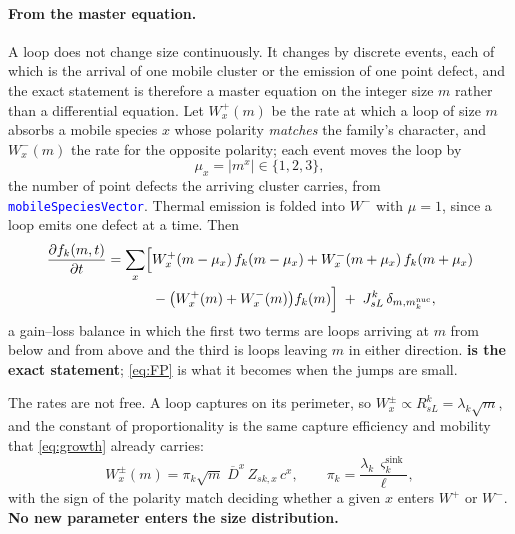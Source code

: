 \documentclass{article}
\newcommand{\textttclr}[1]{\textcolor{blue}{\texttt{#1}}}
\begin{document}
\paragraph{From the master equation.} A loop does not change size continuously.
It changes by discrete events, each of which is the arrival of one mobile cluster
or the emission of one point defect, and the exact statement is therefore a
master equation on the integer size $m$ rather than a differential equation. Let
$W^{+}_{x}(m)$ be the rate at which a loop of size $m$ absorbs a mobile species
$x$ whose polarity \emph{matches} the family's character, and $W^{-}_{x}(m)$ the
rate for the opposite polarity; each event moves the loop by
\begin{equation}
  \mu_x=\left|m^x\right|\in\{1,2,3\},
  \label{eq:jump}
\end{equation}
the number of point defects the arriving cluster carries, from
\textttclr{mobileSpeciesVector}. Thermal emission is folded into $W^{-}$ with
$\mu=1$, since a loop emits one defect at a time. Then
\begin{equation}
\begin{split}
  \frac{\partial f_k(m,t)}{\partial t}
  =\sum_x\Bigl[&W^{+}_{x}(m-\mu_x)\,f_k(m-\mu_x)
              +W^{-}_{x}(m+\mu_x)\,f_k(m+\mu_x)\\
              &-\bigl(W^{+}_{x}(m)+W^{-}_{x}(m)\bigr)f_k(m)\Bigr]
  \;+\;J^k_{sL}\,\delta_{m,m^{\mathrm{nuc}}_k} ,
\end{split}
  \label{eq:master}
\end{equation}
a gain--loss balance in which the first two terms are loops arriving at $m$ from
below and from above and the third is loops leaving $m$ in either direction.
\textbf{ is the exact statement}; \cref{eq:FP} is what it becomes
when the jumps are small.

The rates are not free. A loop captures on its perimeter, so $W^{\pm}_x\propto
R^k_{sL}=\lambda_k\sqrt m$, and the constant of proportionality is the same
capture efficiency and mobility that \cref{eq:growth} already carries:
\begin{equation}
  W^{\pm}_{x}(m)=\pi_k\sqrt m\;\overline D^{x}\,Z_{sk,x}\,c^{x},
  \qquad
  \pi_k=\frac{\lambda_k\,\varsigma^{\mathrm{sink}}_k}{\ell},
  \label{eq:Wrates}
\end{equation}
with the sign of the polarity match deciding whether a given $x$ enters $W^{+}$
or $W^{-}$. \textbf{No new parameter enters the size distribution.}
\end{document}
